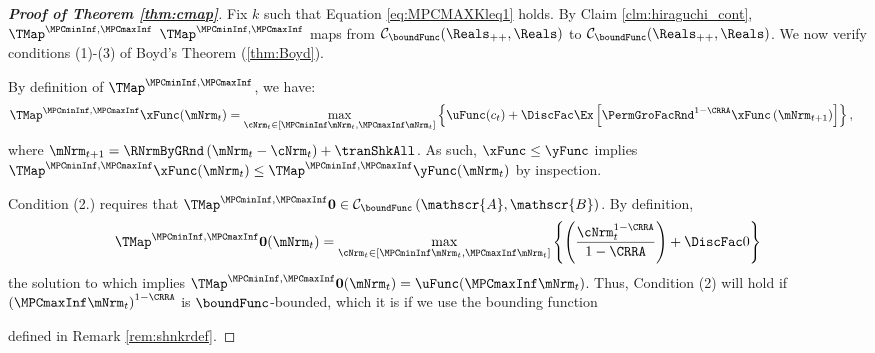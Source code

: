 \documentclass[\econtexRoot/BufferStockTheory]{subfiles}
\begin{document}
\begin{proof}[\textbf{Proof of Theorem \ref{thm:cmap}}]
Fix $k$ such that Equation \eqref{eq:MPCMAXKleq1} holds.
By Claim \ref{clm:hiraguchi_cont}, $\TMap^{\MPCminInf, \MPCmaxInf}$  $\TMap^{\MPCminInf, \MPCmaxInf}$ maps from $\mathcal{C}_{\boundFunc}(\Reals_{++},\Reals)$ to $\mathcal{C}_{\boundFunc}(\Reals_{++},\Reals)$.
We now verify conditions (1)-(3) of Boyd's Theorem (\ref{thm:Boyd}). 

 By definition of $\TMap^{\MPCminInf, \MPCmaxInf}$, we have: 
\begin{align}
  \TMap^{\MPCminInf, \MPCmaxInf}{\mathfrak{\xFunc}}(\mNrm_{t}) & = \underset{\cNrm_{t} \in
                                            [\MPCminInf \mNrm_{t}, \MPCmaxInf \mNrm_{t}]
                                            }\max \left\{
                                            \uFunc(c_{t})+\DiscFac \Ex\left[ {\PermGroFacRnd}^{1-\CRRA }{\mathfrak{\xFunc}}
                                            \left( {\mNrm}_{t+1}\right) \right] \right\},    \label{eq:condition1}
\end{align}%
%
where ${\mNrm}_{t+1} = \RNrmByGRnd\left(\mNrm_{t} - \cNrm_{t}\right) + \tranShkAll$. As such, ${\mathfrak{\xFunc}} \leq {\mathfrak{\yFunc}}$ implies $\TMap^{\MPCminInf, \MPCmaxInf}{\mathfrak{\xFunc}}(\mNrm_{t}) \leq \TMap^{\MPCminInf, \MPCmaxInf}{\mathfrak{\yFunc}} (\mNrm_{t})$ by inspection.

  Condition (2.) requires that $\TMap^{\MPCminInf, \MPCmaxInf}\mathbf{0}\in \mathcal{C}_{\boundFunc}\left(\mathscr{A},\mathscr{B}\right)$.
By definition,
\begin{equation*}
  \TMap^{\MPCminInf, \MPCmaxInf} \mathbf{0}(\mNrm_{t}) = \max_{\cNrm_{t} \in
    [\MPCminInf \mNrm_{t}, \MPCmaxInf \mNrm_{t}]
  }\left\{ \left( \frac{\cNrm_{t}^{1-\CRRA }}{1-\CRRA }\right) +\DiscFac 0\right\}
\end{equation*}
the solution to which implies
$\TMap^{\MPCminInf, \MPCmaxInf} \mathbf{0}(\mNrm_{t}) = \uFunc(\MPCmaxInf \mNrm_{t})$.
Thus, Condition (2)
will hold if ${(\MPCmaxInf \mNrm_{t})}^{1-\CRRA}$ is $\boundFunc$-bounded, which it is if we use the
bounding function

defined in Remark \ref{rem:shnkrdef}. 


\end{proof}
\end{document}
